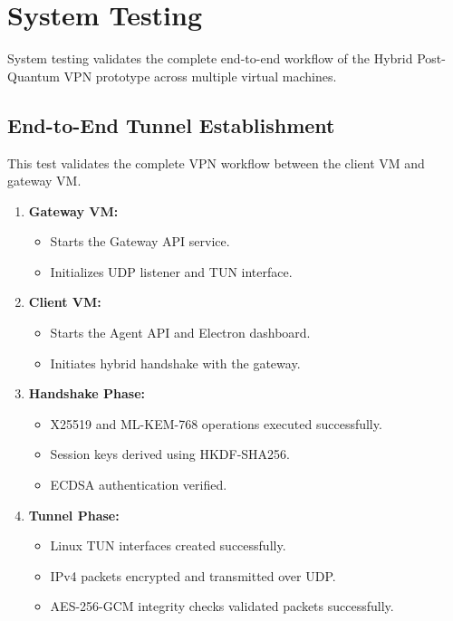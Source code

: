 \section{System Testing}
\label{sec:system_testing}

System testing validates the complete end-to-end workflow of the Hybrid Post-Quantum VPN prototype across multiple virtual machines.

\subsection{End-to-End Tunnel Establishment}

This test validates the complete VPN workflow between the client VM and gateway VM.

\begin{enumerate}
    \item \textbf{Gateway VM:}
    \begin{itemize}
        \item Starts the Gateway API service.
        \item Initializes UDP listener and TUN interface.
    \end{itemize}

    \item \textbf{Client VM:}
    \begin{itemize}
        \item Starts the Agent API and Electron dashboard.
        \item Initiates hybrid handshake with the gateway.
    \end{itemize}

    \item \textbf{Handshake Phase:}
    \begin{itemize}
        \item X25519 and ML-KEM-768 operations executed successfully.
        \item Session keys derived using HKDF-SHA256.
        \item ECDSA authentication verified.
    \end{itemize}

    \item \textbf{Tunnel Phase:}
    \begin{itemize}
        \item Linux TUN interfaces created successfully.
        \item IPv4 packets encrypted and transmitted over UDP.
        \item AES-256-GCM integrity checks validated packets successfully.
    \end{itemize}
\end{enumerate}


